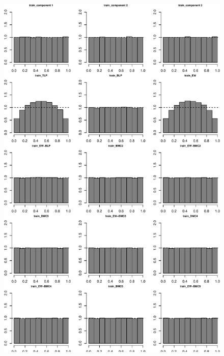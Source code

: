 \documentclass[
]{article}
\begin{document}
\begin{figure}[h]

{\centering \includegraphics{applied_blp_sim_files/figure-latex/unnamed-chunk-6-1} 

}

\end{figure}

\clearpage
\end{document}
